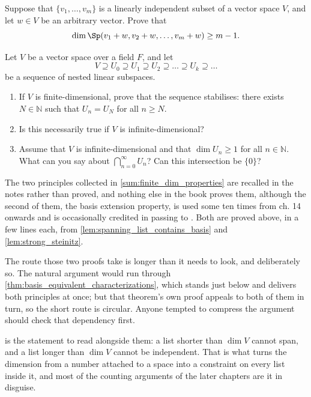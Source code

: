 \begin{exercise}
\label{exc:shifted_span_dimension}
Suppose that $\{v_1, \dots, v_m\}$ is a linearly independent subset of a vector space $V$, and let $w \in V$ be an arbitrary vector. Prove that
\[
\dim \Sp(v_1 + w, v_2 + w, \dots, v_m + w) \ge m - 1.
\]
\end{exercise}

\begin{exercise}
\label{exc:descending_chains_subspaces}
Let $V$ be a vector space over a field $F$, and let
\[
V \supseteq U_0 \supseteq U_1 \supseteq U_2 \supseteq \dots \supseteq U_k \supseteq \dots
\]
be a sequence of nested linear subspaces.
\begin{enumerate}
    \item If $V$ is finite-di\-men\-sional, prove that the sequence stabilises: there exists $N \in \mathbb{N}$ such that $U_n = U_N$ for all $n \ge N$.
    \item Is this necessarily true if $V$ is infinite-di\-men\-sional?
    \item Assume that $V$ is infinite-di\-men\-sional and that $\dim U_n \ge 1$ for all $n \in \mathbb{N}$. What can you say about $\bigcap_{n=0}^\infty U_n$? Can this intersection be $\{0\}$?
\end{enumerate}
\end{exercise}

\begin{ainote}
The two principles collected in \cref{sum:finite_dim_properties} are recalled in
the notes rather than proved, and nothing else in the book proves them, although
the second of them, the basis extension property, is used some ten times from
ch. 14 onwards and is occasionally credited in passing to . Both are proved above, in a few lines each, from
\cref{lem:spanning_list_contains_basis} and \cref{lem:strong_steinitz}.

The route those two proofs take is longer than it needs to look, and
deliberately so. The natural argument would run through
\cref{thm:basis_equivalent_characterizations}, which stands just below and
delivers both principles at once; but that theorem's own proof appeals to both
of them in turn, so the short route is circular. Anyone tempted to compress the
argument should check that dependency first.

 is the statement to read alongside them: a list
shorter than $\dim V$ cannot span, and a list longer than $\dim V$ cannot be
independent. That is what turns the dimension from a number attached to a space
into a constraint on every list inside it, and most of the counting arguments of
the later chapters are it in disguise.
\end{ainote}



